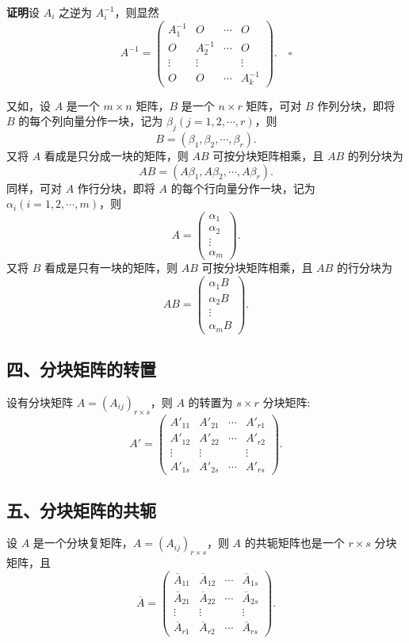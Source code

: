 \documentclass[UTF8, 12pt, fontset=fandol, oneside]{ctexart}
\begin{document}
\noindent\textbf{证明}\quad 设 $A_i$ 之逆为 $A_i^{-1}$，则显然
\[
A^{-1}=\left(\begin{array}{cccc}
A_1^{-1} & O & \cdots & O\\
O & A_2^{-1} & \cdots & O\\
\vdots & \vdots & & \vdots\\
O & O & \cdots & A_k^{-1}
\end{array}\right). \quad \square
\]

又如，设 $A$ 是一个 $m\times n$ 矩阵，$B$ 是一个 $n\times r$ 矩阵，可对 $B$ 作列分块，即将 $B$ 的每个列向量分作一块，记为 $\beta_j(j=1,2,\cdots,r)$，则
\[
B=(\beta_1,\beta_2,\cdots,\beta_r).
\]
又将 $A$ 看成是只分成一块的矩阵，则 $AB$ 可按分块矩阵相乘，且 $AB$ 的列分块为
\[
AB=(A\beta_1,A\beta_2,\cdots,A\beta_r).
\]
同样，可对 $A$ 作行分块，即将 $A$ 的每个行向量分作一块，记为 $\alpha_i(i=1,2,\cdots,m)$，则
\[
A=\left(\begin{array}{c}
\alpha_1\\
\alpha_2\\
\vdots\\
\alpha_m
\end{array}\right).
\]
又将 $B$ 看成是只有一块的矩阵，则 $AB$ 可按分块矩阵相乘，且 $AB$ 的行分块为
\[
AB=\left(\begin{array}{c}
\alpha_1B\\
\alpha_2B\\
\vdots\\
\alpha_mB
\end{array}\right).
\]

\subsection*{四、分块矩阵的转置}

设有分块矩阵 $A=(A_{ij})_{r\times s}$，则 $A$ 的转置为 $s\times r$ 分块矩阵:
\[
A'=\left(\begin{array}{cccc}
A'_{11} & A'_{21} & \cdots & A'_{r1}\\
A'_{12} & A'_{22} & \cdots & A'_{r2}\\
\vdots & \vdots & & \vdots\\
A'_{1s} & A'_{2s} & \cdots & A'_{rs}
\end{array}\right).
\]

\subsection*{五、分块矩阵的共轭}

设 $A$ 是一个分块复矩阵，$A=(A_{ij})_{r\times s}$，则 $A$ 的共轭矩阵也是一个 $r\times s$ 分块矩阵，且
\[
\overline{A}=\left(\begin{array}{cccc}
\overline{A}_{11} & \overline{A}_{12} & \cdots & \overline{A}_{1s}\\
\overline{A}_{21} & \overline{A}_{22} & \cdots & \overline{A}_{2s}\\
\vdots & \vdots & & \vdots\\
\overline{A}_{r1} & \overline{A}_{r2} & \cdots & \overline{A}_{rs}
\end{array}\right).
\]
\end{document}
